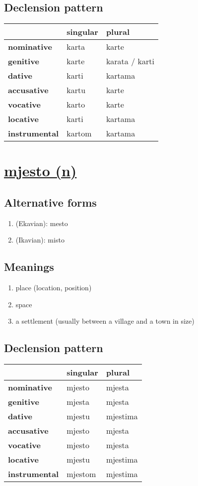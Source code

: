 \subsection*{Declension pattern}
\begin{tabularx}{\linewidth}{Xll}
\toprule
{} & singular &          plural \\
\midrule
\textbf{nominative  } &    karta &           karte \\
\textbf{genitive    } &    karte &  karata / karti \\
\textbf{dative      } &    karti &         kartama \\
\textbf{accusative  } &    kartu &           karte \\
\textbf{vocative    } &    karto &           karte \\
\textbf{locative    } &    karti &         kartama \\
\textbf{instrumental} &   kartom &         kartama \\
\bottomrule
\end{tabularx}

\filbreak
\section{\underline{mjesto (n)}}
\subsection*{Alternative forms}
\begin{enumerate}
\item (Ekavian): mesto
\item (Ikavian): misto
\end{enumerate}
\subsection*{Meanings}
\begin{enumerate}
\item place (location, position)
\item space
\item a settlement (usually between a village and a town in size)
\end{enumerate}
\subsection*{Declension pattern}
\begin{tabularx}{\linewidth}{Xll}
\toprule
{} & singular &    plural \\
\midrule
\textbf{nominative  } &   mjesto &    mjesta \\
\textbf{genitive    } &   mjesta &    mjesta \\
\textbf{dative      } &   mjestu &  mjestima \\
\textbf{accusative  } &   mjesto &    mjesta \\
\textbf{vocative    } &   mjesto &    mjesta \\
\textbf{locative    } &   mjestu &  mjestima \\
\textbf{instrumental} &  mjestom &  mjestima \\
\bottomrule
\end{tabularx}

